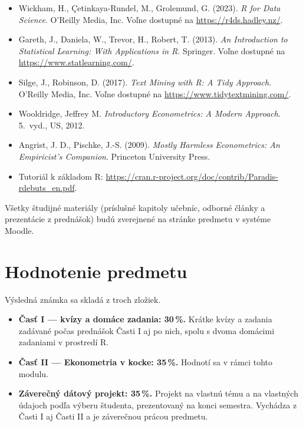 \documentclass[11pt]{article}
\begin{document}
\begin{itemize}
  \item Wickham, H., Çetinkaya-Rundel, M., Grolemund, G. (2023). \textit{R for Data Science}. O'Reilly
        Media, Inc. Voľne dostupné na \url{https://r4ds.hadley.nz/}.
  \item Gareth, J., Daniela, W., Trevor, H., Robert, T. (2013). \textit{An Introduction to Statistical
        Learning: With Applications in R}. Springer. Voľne dostupné na \url{https://www.statlearning.com/}.
  \item Silge, J., Robinson, D. (2017). \textit{Text Mining with R: A Tidy Approach}. O'Reilly Media, Inc.
        Voľne dostupné na \url{https://www.tidytextmining.com/}.
  \item Wooldridge, Jeffrey M. \textit{Introductory Econometrics: A Modern Approach}. 5.~vyd., US, 2012.
  \item Angrist, J. D., Pischke, J.-S. (2009). \textit{Mostly Harmless Econometrics: An Empiricist's
        Companion}. Princeton University Press.
  \item Tutoriál k základom R: \url{https://cran.r-project.org/doc/contrib/Paradis-rdebuts_en.pdf}.
\end{itemize}

Všetky študijné materiály (príslušné kapitoly učebníc, odborné články a prezentácie z prednášok) budú
zverejnené na stránke predmetu v systéme Moodle.

\section{Hodnotenie predmetu}

Výsledná známka sa skladá z troch zložiek.

\begin{itemize}
  \item \textbf{Časť I --- kvízy a domáce zadania: 30\,\%.} Krátke kvízy a zadania zadávané počas prednášok
        Časti I aj po nich, spolu s dvoma domácimi zadaniami v prostredí R.
  \item \textbf{Časť II --- Ekonometria v kocke: 35\,\%.} Hodnotí sa v rámci tohto modulu.
  \item \textbf{Záverečný dátový projekt: 35\,\%.} Projekt na vlastnú tému a na vlastných údajoch podľa
        výberu študenta, prezentovaný na konci semestra. Vychádza z Časti I aj Časti II a je záverečnou
        prácou predmetu.
\end{itemize}
\end{document}
